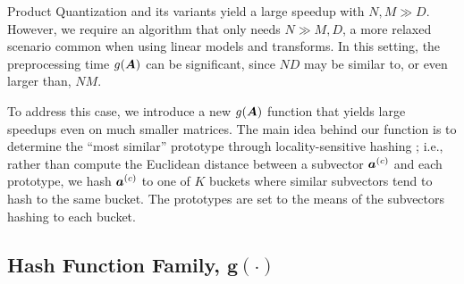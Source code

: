 

Product Quantization and its variants yield a large speedup with $N, M \gg D$. However, we require an algorithm that only needs $N \gg M, D$, a more relaxed scenario common when using linear models and transforms. In this setting, the preprocessing time $g(\bm{A})$ can be significant, since $ND$ may be similar to, or even larger than, $NM$.

To address this case, we introduce a new $g(\bm{A})$ function that yields large speedups even on much smaller matrices. %
The main idea behind our function is to determine the ``most similar'' prototype through locality-sensitive hashing \cite{lshOrig}; i.e., rather than compute the Euclidean distance between a subvector $\bm{a}^{(c)}$ and each prototype, we hash $\bm{a}^{(c)}$ to one of $K$ buckets where similar subvectors tend to hash to the same bucket. The prototypes are set to the means of the subvectors hashing to each bucket.%


\vspace{-1mm}
\subsection{Hash Function Family, $\bm{g(\cdot)}$}

